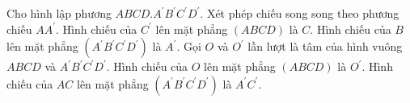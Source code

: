 \begin{ex}
Cho hình lập phương $ABCD.A^{\prime}B^{\prime}C^{\prime}D^{\prime}$. Xét phép chiếu song song theo phương chiếu $AA^{\prime}$.
\choiceTF
{\True Hình chiếu của $C^{\prime}$ lên mặt phẳng $(ABCD)$ là $C$.}
{Hình chiếu của $B$ lên mặt phẳng $(A^{\prime}B^{\prime}C^{\prime}D^{\prime})$ là $A^{\prime}$.}
{Gọi $O$ và $O^{\prime}$ lần lượt là tâm của hình vuông $ABCD$ và $A^{\prime}B^{\prime}C^{\prime}D^{\prime}$. Hình chiếu của $O$ lên mặt phẳng $(ABCD)$ là $O^{\prime}$.}
{\True Hình chiếu của $AC$ lên mặt phẳng $(A^{\prime}B^{\prime}C^{\prime}D^{\prime})$ là $A^{\prime}C^{\prime}$.}
\end{ex}
